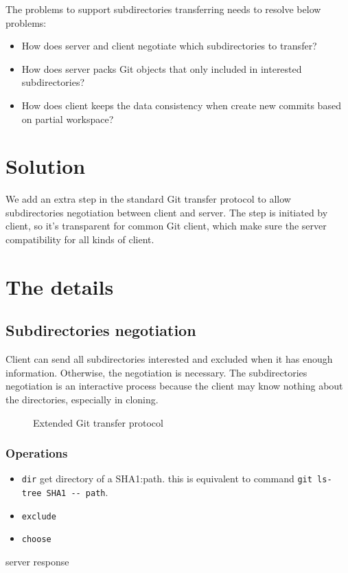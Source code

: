 \documentclass[preprint]{sigplanconf}
\begin{document}
The problems to support subdirectories transferring needs to resolve below problems:
\begin{itemize}
  \item How does server and client negotiate which subdirectories to transfer?
  \item How does server packs Git objects that only included in interested subdirectories?
  \item How does client keeps the data consistency when create new commits based on partial workspace?
\end{itemize}

\section{Solution}
We add an extra step in the standard Git transfer protocol to allow subdirectories negotiation between client and server.
The step is initiated by client, so it's transparent for common Git client, which make sure the server compatibility for all kinds of client.


\section{The details}

\subsection{Subdirectories negotiation}
Client can send all subdirectories interested and excluded when it has enough information.
Otherwise, the negotiation is necessary.
The subdirectories negotiation is an interactive process because the client may know nothing about the directories, especially in cloning.
\begin{figure}
  \centering
  
  \caption{Extended Git transfer protocol}
  \label{fig:git-proto-ext-seq}
\end{figure}
\subsubsection{Operations}
\begin{itemize}
  \item \verb|dir| get directory of a SHA1:path.
    this is equivalent to command \verb|git ls-tree SHA1 -- path|.
  \item \verb|exclude| 
  \item \verb|choose|
\end{itemize}
server response
\end{document}
